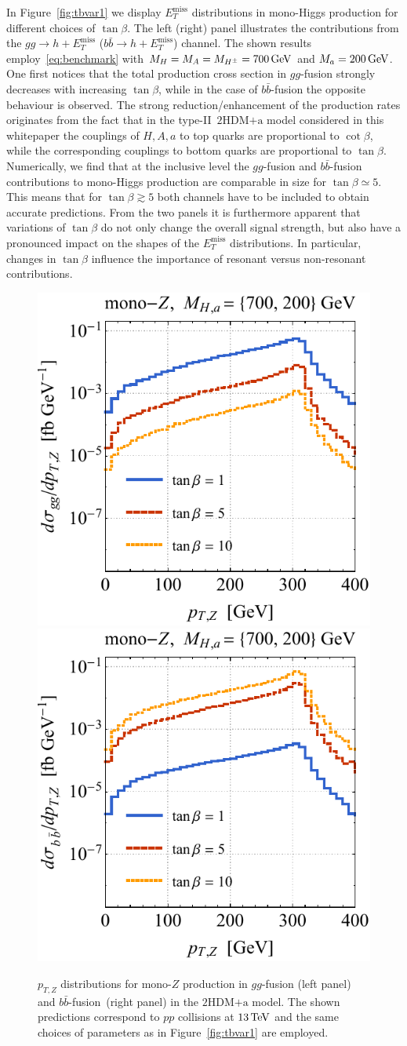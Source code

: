 \documentclass[a4paper, 11pt,notoc]{article}
\newcommand{\MET}{\ensuremath{E_T^\mathrm{miss}}\xspace}
\newcommand{\mA}{\ensuremath{M_{A}}\xspace}
\newcommand{\ma}{\ensuremath{M_{a}}\xspace}
\newcommand{\mH}{\ensuremath{M_{H}}\xspace}
\newcommand{\mHc}{\ensuremath{M_{H^{\pm}}}\xspace}
\newcommand{\hdma}{\ensuremath{\textrm{2HDM+a}}\xspace}
\begin{document}
In Figure~\ref{fig:tbvar1} we display $\MET$ distributions in mono-Higgs production for different choices of $\tan \beta$. The left (right) panel illustrates the contributions from the $gg \to h + \MET$ ($b \bar b \to h + \MET$) channel. {\color{red} The shown results employ~\eqref{eq:benchmark} with $\mH = \mA = \mHc = 700 \, {\rm GeV}$ and $\ma = 200 \, {\rm GeV}$.} One first notices that the total production cross section in $gg$-fusion strongly decreases with increasing $\tan \beta$, while in the case of $b \bar b$-fusion the opposite behaviour is observed. {\color{red} The strong reduction/enhancement of the production rates originates from the fact that in  the type-II~\hdma model considered in this whitepaper the couplings of $H,A,a$ to top quarks are proportional to $\cot \beta$, while the corresponding couplings to bottom quarks are proportional to $\tan \beta$.} Numerically, we find that at the inclusive level the $gg$-fusion and $b\bar b$-fusion contributions to mono-Higgs production are comparable in size for $\tan \beta \simeq 5$. This means that for $\tan \beta \gtrsim 5$ both channels have to be included to obtain accurate predictions. From the two panels it is furthermore apparent that variations of $\tan \beta$ do not only change the overall signal strength, but also have a pronounced impact on the shapes of the $\MET$ distributions. In particular, changes in $\tan \beta$ influence the importance of resonant versus non-resonant contributions. 

\begin{figure}[t!]
\centering
\includegraphics[height=0.45\textwidth]{tblz.pdf} \qquad 
\includegraphics[height=0.45\textwidth]{tbrz.pdf}
\vspace{2mm}
\vspace{2mm}
\caption{\label{fig:tbvar2} 
$p_{T,Z}$ distributions for mono-$Z$ production in $gg$-fusion (left panel) and $b \bar b$-fusion~(right panel) in the \hdma model. The shown predictions correspond to $pp$ collisions at $13 \, {\rm TeV}$ and the same choices of parameters as in Figure~\ref{fig:tbvar1} are employed.}
\end{figure}
\end{document}
